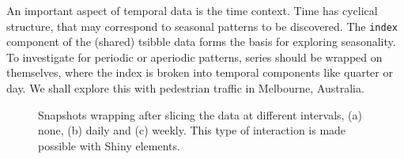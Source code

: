 An important aspect of temporal data is the time context. Time has
cyclical structure, that may correspond to seasonal patterns to be
discovered. The \texttt{index} component of the (shared) tsibble data
forms the basis for exploring seasonality. To investigate for periodic
or aperiodic patterns, series should be wrapped on themselves, where the
index is broken into temporal components like quarter or day. We shall
explore this with pedestrian traffic in Melbourne, Australia.

\begin{Schunk}
\begin{figure}

{\centering {}\newline{}\newline{}

}

\caption[Snapshots wrapping after slicing the  data at different intervals, (a) none, (b) daily and (c) weekly]{Snapshots wrapping after slicing the  data at different intervals, (a) none, (b) daily and (c) weekly. This type of interaction is made possible with Shiny elements.}\label{fig:wrap-ped}
\end{figure}
\end{Schunk}

